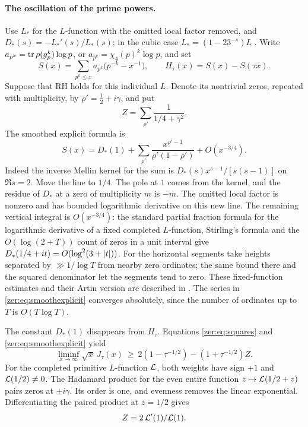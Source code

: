 \paragraph{The oscillation of the prime powers.}
Use $L_*$ for the $L$-function with the omitted local factor removed, and
$D_*(s)=-L_*'(s)/L_*(s)$; in the cubic case $L_*=(1-23^{-s})L$ \cite{Serre2003Jordan}.
Write $a_{p^k}=\operatorname{tr}\rho(g_p^k)\log p$, or $a_{p^k}=\chi_4(p)^k\log p$, and set
\[
 S(x)=\sum_{p^k\le x}a_{p^k}\bigl(p^{-k}-x^{-1}\bigr),\qquad H_\tau(x)=S(x)-S(\tau x).
\]
Suppose that RH holds for this individual $L$. Denote its nontrivial zeros, repeated with
multiplicity, by $\rho'=\tfrac12+i\gamma$, and put
\begin{equation}\label{zer:eq:Z}
 Z=\sum_{\rho'}\frac1{1/4+\gamma^2}.
\end{equation}
The smoothed explicit formula is
\begin{equation}\label{zer:eq:smoothexplicit}
 S(x)=D_*(1)+\sum_{\rho'}\frac{x^{\rho'-1}}{\rho'(1-\rho')}+O(x^{-3/4}).
\end{equation}
Indeed the inverse Mellin kernel for the sum is $D_*(s)x^{s-1}/[s(s-1)]$ on $\Re s=2$. Move
the line to $1/4$. The pole at $1$ comes from the kernel, and the residue of $D_*$ at a
zero of multiplicity $m$ is $-m$. The omitted local factor is nonzero and has bounded
logarithmic derivative on this new line. The remaining vertical integral is $O(x^{-3/4})$:
the standard partial fraction formula for the logarithmic derivative of a fixed completed
$L$-function, Stirling's formula and the $O(\log(2+T))$ count of zeros in a unit interval
give $D_*(1/4+it)=O(\log^2(3+\lvert t\rvert))$. For the horizontal segments take heights separated
by $\gg1/\log T$ from nearby zero ordinates; the same bound there and the squared
denominator let the segments tend to zero. These fixed-function estimates and their Artin
version are described in \cite{Ng2000Limiting}. The series in
\eqref{zer:eq:smoothexplicit} converges absolutely, since the number of ordinates up to $T$
is $O(T\log T)$.

The constant $D_*(1)$ disappears from $H_\tau$. Equations \eqref{zer:eq:squares} and
\eqref{zer:eq:smoothexplicit} yield
\begin{equation}\label{zer:eq:liminf}
 \liminf_{x\to\infty}\sqrt x\,J_\tau(x)\ \ge\ 2(1-\tau^{-1/2})-(1+\tau^{-1/2})Z .
\end{equation}
For the completed primitive $L$-function $\mathcal{L}$, both weights have sign $+1$ and
$\mathcal{L}(1/2)\ne0$. The Hadamard product for the even entire function
$z\mapsto\mathcal{L}(1/2+z)$ pairs zeros at $\pm i\gamma$. Its order is one, and evenness
removes the linear exponential. Differentiating the paired product at $z=1/2$ gives
\begin{equation}\label{zer:eq:Zformula}
 Z=2\,\mathcal{L}'(1)/\mathcal{L}(1).
\end{equation}

